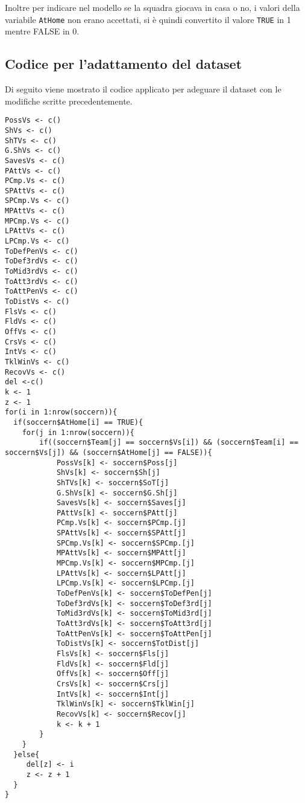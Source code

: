 Inoltre per indicare nel modello se la squadra giocava in casa o no, i valori della variabile \texttt{AtHome} non erano accettati, si è quindi convertito il valore \texttt{TRUE} in 1 mentre FALSE in 0.



\subsection{Codice per l'adattamento del dataset}
Di seguito viene mostrato il codice applicato per adeguare il dataset con le modifiche scritte precedentemente.

\begin{lstlisting}
PossVs <- c()
ShVs <- c()
ShTVs <- c()
G.ShVs <- c()
SavesVs <- c()
PAttVs <- c()
PCmp.Vs <- c()
SPAttVs <- c()
SPCmp.Vs <- c()
MPAttVs <- c()
MPCmp.Vs <- c()
LPAttVs <- c()
LPCmp.Vs <- c()
ToDefPenVs <- c()
ToDef3rdVs <- c()
ToMid3rdVs <- c()
ToAtt3rdVs <- c()
ToAttPenVs <- c()
ToDistVs <- c()
FlsVs <- c()
FldVs <- c()
OffVs <- c()
CrsVs <- c()
IntVs <- c()
TklWinVs <- c()
RecovVs <- c()
del <-c()
k <- 1
z <- 1
for(i in 1:nrow(soccern)){
  if(soccern$AtHome[i] == TRUE){
	for(j in 1:nrow(soccern)){
		if((soccern$Team[j] == soccern$Vs[i]) && (soccern$Team[i] == soccern$Vs[j]) && (soccern$AtHome[j] == FALSE)){
			PossVs[k] <- soccern$Poss[j]
			ShVs[k] <- soccern$Sh[j]
			ShTVs[k] <- soccern$SoT[j]
			G.ShVs[k] <- soccern$G.Sh[j]
			SavesVs[k] <- soccern$Saves[j]
			PAttVs[k] <- soccern$PAtt[j]
			PCmp.Vs[k] <- soccern$PCmp.[j]
			SPAttVs[k] <- soccern$SPAtt[j]
			SPCmp.Vs[k] <- soccern$SPCmp.[j]
			MPAttVs[k] <- soccern$MPAtt[j]
			MPCmp.Vs[k] <- soccern$MPCmp.[j]
			LPAttVs[k] <- soccern$LPAtt[j]
			LPCmp.Vs[k] <- soccern$LPCmp.[j]
			ToDefPenVs[k] <- soccern$ToDefPen[j]
			ToDef3rdVs[k] <- soccern$ToDef3rd[j]
			ToMid3rdVs[k] <- soccern$ToMid3rd[j]
			ToAtt3rdVs[k] <- soccern$ToAtt3rd[j]
			ToAttPenVs[k] <- soccern$ToAttPen[j]
			ToDistVs[k] <- soccern$TotDist[j]
			FlsVs[k] <- soccern$Fls[j]
			FldVs[k] <- soccern$Fld[j]
			OffVs[k] <- soccern$Off[j]
			CrsVs[k] <- soccern$Crs[j]
			IntVs[k] <- soccern$Int[j]
			TklWinVs[k] <- soccern$TklWin[j]
			RecovVs[k] <- soccern$Recov[j]
			k <- k + 1
		}      
	}
  }else{
	 del[z] <- i
	 z <- z + 1
  }
}
\end{lstlisting}
\bigskip

